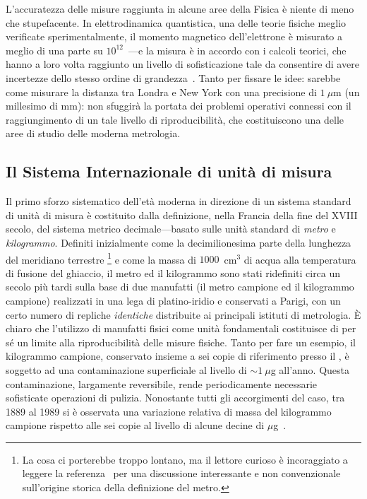 L'accuratezza delle misure raggiunta in alcune aree della Fisica è niente di
meno che stupefacente. In elettrodinamica quantistica, una delle teorie fisiche
meglio verificate sperimentalmente, il momento magnetico dell'elettrone è
misurato a meglio di una parte su $10^{12}$~\cite{PhysRevA.83.052122}---e la
misura è in accordo con i calcoli teorici, che hanno a loro volta raggiunto un
livello di sofisticazione tale da consentire di avere incertezze dello stesso
ordine di grandezza~\cite{PhysRevLett.109.111807}. Tanto per fissare le idee:
sarebbe come misurare la distanza tra Londra e New York con una precisione di
$1~\mu$m (un millesimo di mm): non sfuggirà la portata dei problemi operativi
connessi con il raggiungimento di un tale livello di riproducibilità, che
costituiscono una delle aree di studio delle moderna metrologia.


\subsection{Il Sistema Internazionale di unità di misura}

Il primo sforzo sistematico dell'età moderna in direzione di un sistema
standard di unità di misura è costituito dalla definizione, nella Francia
della fine del XVIII secolo, del sistema metrico decimale---basato sulle
unità standard di \emph{metro} e \emph{kilogrammo}. Definiti inizialmente
come la decimilionesima parte della lunghezza del meridiano terrestre%
\footnote{La cosa ci porterebbe troppo lontano, ma il lettore curioso è
  incoraggiato a leggere la referenza~\cite{dagostini_metro} per una
  discussione interessante e non convenzionale sull'origine storica della
  definizione del metro.}
e come la massa di $1000$~cm$^3$ di acqua alla temperatura di fusione del
ghiaccio, il metro ed il kilogrammo sono stati ridefiniti circa un secolo più
tardi sulla base di due manufatti (il metro campione ed il kilogrammo campione)
realizzati in una lega di platino-iridio e conservati a Parigi, con un certo
numero di repliche \emph{identiche} distribuite ai principali istituti di
metrologia. \`E chiaro che l'utilizzo di manufatti fisici come unità
fondamentali costituisce di per sé un limite alla riproducibilità delle
misure fisiche. Tanto per fare un esempio, il kilogrammo campione, conservato
insieme a sei copie di riferimento presso il ,
è soggetto ad una contaminazione superficiale al livello di $\sim 1~\mu$g
all'anno. Questa contaminazione, largamente reversibile, rende periodicamente
necessarie sofisticate operazioni di pulizia. Nonostante tutti gli accorgimenti
del caso, tra 1889 al 1989 si è osservata una variazione relativa di massa del
kilogrammo campione rispetto alle sei copie al livello di alcune decine di
$\mu$g~\cite{si_unit_mass}.

